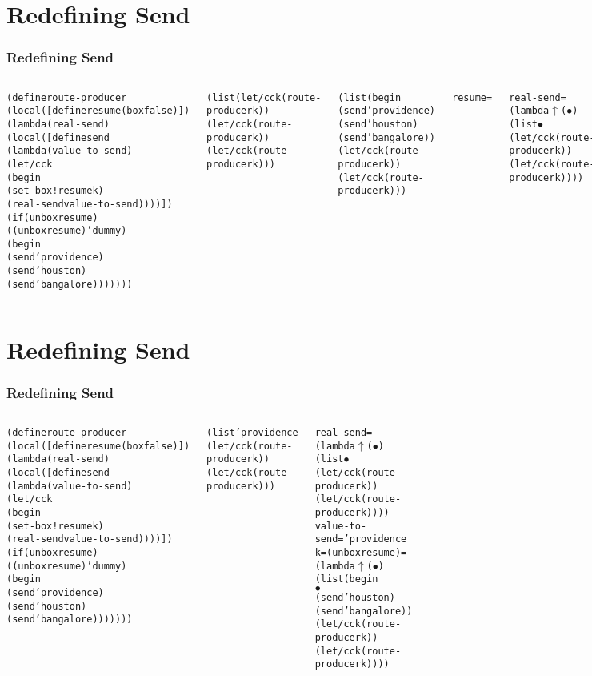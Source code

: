 \documentclass[slidestop,xcolor=pst,dvips]{beamer}
\newcommand{\sect}[1]{
\section{#1}
\begin{frame}[fragile]\frametitle{#1}
}
\newcommand{\lmb}{{lambda$\uparrow$}}
\newcommand{\bul}{{$\bullet$}}
\newcommand{\ba}{\begin{alltt}}
\newcommand{\ea}{\end{alltt}}
\begin{document}
\sect{Redefining Send}
\begin{columns}[t]
\ba(define route-producer
  (local ([define resume (box false)])
    (lambda (real-send)
      (local ([define send 
                (lambda (value-to-send)
                  (let/cc k
                    (begin
                      (set-box! resume k)
                      (real-send value-to-send))))])
        (if (unbox resume)
            ((unbox resume) 'dummy)
            (begin
              (send 'providence)
              (send 'houston)
              (send 'bangalore)))))))

(list (let/cc k (route-producer k))
      (let/cc k (route-producer k))
      (let/cc k (route-producer k)))\ea{}\ba
(list (begin
        (send 'providence)
        (send 'houston)
        (send 'bangalore))
      (let/cc k (route-producer k))
      (let/cc k (route-producer k)))
\ea
{}
\ba resume = \ea
{}\ba
real-send =
(\lmb (\bul)
  (list \bul
        (let/cc k (route-producer k))
        (let/cc k (route-producer k))))\ea{}\ba
value-to-send = 'providence
k = (unbox resume) = 
(\lmb (\bul)
  (list (begin
          \bul
          (send 'houston)
          (send 'bangalore))
        (let/cc k (route-producer k))
        (let/cc k (route-producer k))))
\ea
{}

\ba
(list 'providence
      (let/cc k (route-producer k))
      (let/cc k (route-producer k)))\ea
\end{columns}
\end{frame}

\sect{Redefining Send}
\begin{columns}[t]
\ba(define route-producer
  (local ([define resume (box false)])
    (lambda (real-send)
      (local ([define send 
                (lambda (value-to-send)
                  (let/cc k
                    (begin
                      (set-box! resume k)
                      (real-send value-to-send))))])
        (if (unbox resume)
            ((unbox resume) 'dummy)
            (begin
              (send 'providence)
              (send 'houston)
              (send 'bangalore)))))))

(list 'providence
      (let/cc k (route-producer k))
      (let/cc k (route-producer k)))
\ea
{}
\ba
real-send =
(\lmb (\bul)
  (list \bul
        (let/cc k (route-producer k))
        (let/cc k (route-producer k))))
value-to-send = 'providence
k = (unbox resume) = 
(\lmb (\bul)
  (list (begin
          \bul
          (send 'houston)
          (send 'bangalore))
        (let/cc k (route-producer k))
        (let/cc k (route-producer k))))
\ea


\end{columns}
\end{frame}
\end{document}
